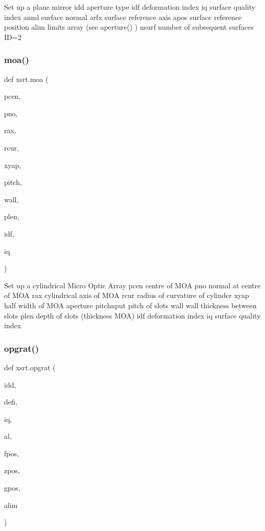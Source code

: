 \begin{DoxyVerb}Set up a plane mirror
    idd       aperture type
    idf       deformation index
    iq        surface quality index
    anml      surface normal
    arfx      surface reference axis
    apos      surface reference position
    alim      limits array (see aperture() )
    nsurf     number of subsequent surfaces ID=2
\end{DoxyVerb}
 \mbox{\label{namespacexsrt_af06ddcb58108434aa5ee18338fe0d0d1}} 
\subsubsection{\texorpdfstring{moa()}{moa()}}
{\footnotesize\ttfamily def xsrt.\+moa (\begin{DoxyParamCaption}\item[{}]{pcen,  }\item[{}]{pno,  }\item[{}]{rax,  }\item[{}]{rcur,  }\item[{}]{xyap,  }\item[{}]{pitch,  }\item[{}]{wall,  }\item[{}]{plen,  }\item[{}]{idf,  }\item[{}]{iq }\end{DoxyParamCaption})}

\begin{DoxyVerb}Set up a cylindrical Micro Optic Array
    pcen        centre of MOA
    pno         normal at centre of MOA
    rax         cylindrical axis of MOA
    rcur        radius of curvature of cylinder
    xyap        half width of MOA aperture
    pitchnput   pitch of slots
    wall        wall thickness between slots
    plen        depth of slots (thickness MOA)
    idf         deformation index
    iq          surface quality index
\end{DoxyVerb}
 \mbox{\label{namespacexsrt_a0eef966b5aae4093422ccc402db07ce0}} 
\subsubsection{\texorpdfstring{opgrat()}{opgrat()}}
{\footnotesize\ttfamily def xsrt.\+opgrat (\begin{DoxyParamCaption}\item[{}]{idd,  }\item[{}]{defi,  }\item[{}]{iq,  }\item[{}]{al,  }\item[{}]{fpos,  }\item[{}]{zpos,  }\item[{}]{gpos,  }\item[{}]{alim }\end{DoxyParamCaption})}

